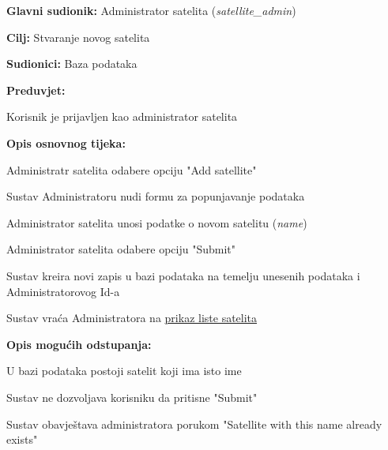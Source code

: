 			\noindent {}
		\begin{packed_item}
			
			\item \textbf{Glavni sudionik: }Administrator satelita (\textit{satellite\_admin})
			\item  \textbf{Cilj: }Stvaranje novog satelita
			\item  \textbf{Sudionici: }Baza podataka
			\item  \textbf{Preduvjet: }
			\begin{packed_enum}
				\item Korisnik je prijavljen kao administrator satelita	\end{packed_enum}
			\item  \textbf{Opis osnovnog tijeka: }
			
			\item[] \begin{packed_enum}
				\item Administratr satelita odabere opciju "Add satellite"
				\item Sustav Administratoru nudi formu za popunjavanje podataka
				\item Administrator satelita unosi podatke o novom satelitu (\textit{name})
				\item Administrator satelita odabere opciju "Submit"
				\item Sustav kreira novi zapis u bazi podataka na temelju unesenih podataka i Administratorovog Id-a
				\item Sustav vraća Administratora na \hyperref[UC19]{prikaz liste satelita } 
				
			\end{packed_enum}
			
			\item  \textbf{Opis mogućih odstupanja: }
			
			\item[] \begin{packed_enum}
				
				\item[1] U bazi podataka postoji satelit koji ima isto ime
				\item[ ] \begin{packed_enum}
					
					\item[1.1] Sustav ne dozvoljava korisniku da pritisne "Submit"
					\item[1.2] Sustav obavještava administratora porukom "Satellite with this name already exists"
				\end{packed_enum}
			\end{packed_enum}
		\end{packed_item}
